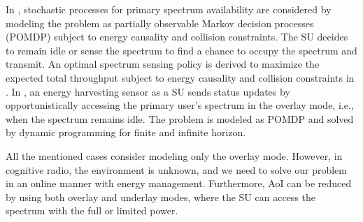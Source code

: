 \documentclass[journal]{IEEEtran}
\begin{document}
		In \cite{Optimal_20}, stochastic processes for primary spectrum availability are considered by modeling the problem as partially observable Markov decision processes (POMDP) subject to energy causality and collision constraints. The SU decides to remain idle or sense the spectrum to find a chance to occupy the spectrum and transmit. An optimal spectrum sensing policy is derived to maximize the expected total throughput subject to energy causality and collision constraints in \cite{Cognitive_21}. In \cite{Age_4}, an energy harvesting sensor as a SU sends status updates by opportunistically accessing the primary user’s spectrum in the overlay mode, i.e., when the spectrum remains idle. The problem is modeled as POMDP and solved by dynamic programming for finite and infinite horizon.
		
		All the mentioned cases consider modeling only the overlay mode. However, in cognitive radio, the environment is unknown, and we need to solve our problem in an online manner with energy management. Furthermore, AoI can be reduced by using both overlay and underlay modes, where the SU can access the spectrum with the full or limited power.
		
\end{document}
